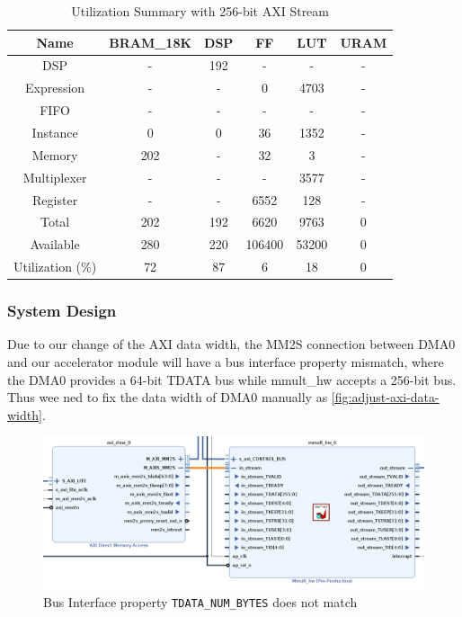 \begin{table}[ht!]
    \centering
    \caption{Utilization Summary with 256-bit AXI Stream}\label{tab:w256}
    \begin{tabular}{cccccc}
        \toprule
        Name             & BRAM\_18K & DSP & FF     & LUT   & URAM \\
        \midrule
        DSP              & -         & 192 & -      & -     & -    \\
        Expression       & -         & -   & 0      & 4703  & -    \\
        FIFO             & -         & -   & -      & -     & -    \\
        Instance         & 0         & 0   & 36     & 1352  & -    \\
        Memory           & 202       & -   & 32     & 3     & -    \\
        Multiplexer      & -         & -   & -      & 3577  & -    \\
        Register         & -         & -   & 6552   & 128   & -    \\
        \midrule
        Total            & 202       & 192 & 6620   & 9763  & 0    \\
        \midrule
        Available        & 280       & 220 & 106400 & 53200 & 0    \\
        \midrule
        Utilization (\%) & 72        & 87  & 6      & 18    & 0    \\
        \bottomrule
    \end{tabular}
\end{table}

\subsubsection{System Design}

Due to our change of the AXI data width, the MM2S connection between DMA0 and our accelerator module will have a bus interface property mismatch, where the DMA0 provides a 64-bit TDATA bus while mmult\_hw accepts a 256-bit bus.
Thus wee ned to fix the data width of DMA0 manually as \autoref{fig:adjust-axi-data-width}.


\begin{figure}[ht!]
    \centering
    \includegraphics[scale=0.32]{images/tdata-mismatch.png}
    \caption{Bus Interface property \texttt{TDATA\_NUM\_BYTES} does not match}
\end{figure}

